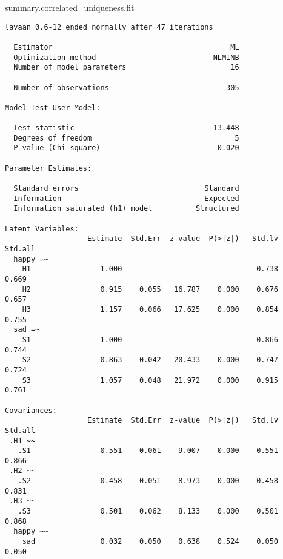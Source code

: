 \documentclass[
  letterpaper,
  DIV=11,
  numbers=noendperiod]{scrreprt}
\newenvironment{Shaded}{\begin{snugshade}}{\end{snugshade}}
\newcommand{\NormalTok}[1]{\textcolor[rgb]{0.00,0.23,0.31}{#1}}
\begin{document}
\begin{Shaded}
\begin{Highlighting}[]
\NormalTok{summary.correlated\_uniqueness.fit}
\end{Highlighting}
\end{Shaded}

\begin{verbatim}
lavaan 0.6-12 ended normally after 47 iterations

  Estimator                                         ML
  Optimization method                           NLMINB
  Number of model parameters                        16

  Number of observations                           305

Model Test User Model:
                                                      
  Test statistic                                13.448
  Degrees of freedom                                 5
  P-value (Chi-square)                           0.020

Parameter Estimates:

  Standard errors                             Standard
  Information                                 Expected
  Information saturated (h1) model          Structured

Latent Variables:
                   Estimate  Std.Err  z-value  P(>|z|)   Std.lv  Std.all
  happy =~                                                              
    H1                1.000                               0.738    0.669
    H2                0.915    0.055   16.787    0.000    0.676    0.657
    H3                1.157    0.066   17.625    0.000    0.854    0.755
  sad =~                                                                
    S1                1.000                               0.866    0.744
    S2                0.863    0.042   20.433    0.000    0.747    0.724
    S3                1.057    0.048   21.972    0.000    0.915    0.761

Covariances:
                   Estimate  Std.Err  z-value  P(>|z|)   Std.lv  Std.all
 .H1 ~~                                                                 
   .S1                0.551    0.061    9.007    0.000    0.551    0.866
 .H2 ~~                                                                 
   .S2                0.458    0.051    8.973    0.000    0.458    0.831
 .H3 ~~                                                                 
   .S3                0.501    0.062    8.133    0.000    0.501    0.868
  happy ~~                                                              
    sad               0.032    0.050    0.638    0.524    0.050    0.050


\end{verbatim}
\end{document}
